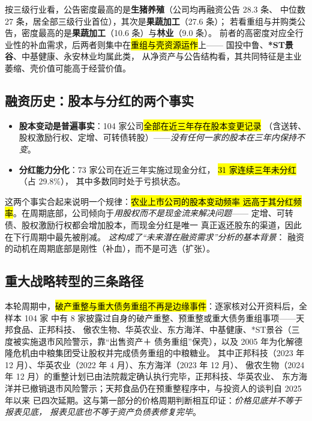 按三级行业看，公告密度最高的是\textbf{生猪养殖}（公司均再融资公告 \num{28.3} 条、
中位数 \num{27} 条，居全部三级行业首位），其次是\textbf{果蔬加工}（\num{27.6} 条）；
若看重组与并购类公告，密度最高的是\textbf{果蔬加工}（\num{10.6} 条）与\textbf{林业}（\num{9.0} 条）。
前者的高密度对应全行业性的补血需求，后两者则集中在\hl{重组与壳资源运作}上——
国投中鲁、\textbf{*ST景谷}、中基健康、永安林业均属此类，
从净资产与公告结构看，其共同特征是主业萎缩、壳价值可能高于经营价值。

\subsection{融资历史：股本与分红的两个事实}
\label{sec:financing-history}

\begin{itemize}[leftmargin=1.4em, itemsep=2pt]
  \item \textbf{股本变动是普遍事实}：\num{104} 家公司\hl{全部在近三年存在股本变更记录}
        （含送转、股权激励行权、定增、可转债转股）——\emph{没有任何一家的股本在三年内保持不变}。
  \item \textbf{分红能力分化}：\num{73} 家公司在近三年实施过现金分红，
        \hl{\num{31} 家连续三年未分红}（占 \num{29.8}\%），
        其中多数同时处于亏损状态。
\end{itemize}

这两个事实合起来说明一个规律：\hl{农业上市公司的股本变动频率
远高于其分红频率}。在周期底部，公司倾向于\emph{用股权而不是现金流来解决问题}——
定增、可转债、股权激励行权都会增加股本，而现金分红是唯一
真正返还股东的渠道，因此在下行周期中最先被削减。
\emph{这构成了“未来潜在融资需求”分析的基本背景}：
融资的动机在周期底部是刚性（补血），而不是可选（扩张）。

\subsection{重大战略转型的三条路径}
\label{sec:financing-strategy}

本轮周期中，\hl{破产重整与重大债务重组不再是边缘事件}：逐家核对公开资料后，全样本 \num{104} 家
中有 \num{8} 家披露过自身的破产重整、预重整或重大债务重组事项——天邦食品、正邦科技、
傲农生物、华英农业、东方海洋、中基健康、*ST景谷（三度被实施退市风险警示，靠“出售资产＋
债务重组”保壳），以及 2005 年为化解德隆危机由中粮集团受让股权并完成债务重组的中粮糖业。
其中正邦科技（2023 年 12 月）、华英农业（2022 年 4 月）、东方海洋（2023 年 12 月）、
傲农生物（2024 年 12 月）的重整计划已由法院裁定确认执行完毕，正邦科技、华英农业、
东方海洋并已撤销退市风险警示；天邦食品仍在预重整程序中，与投资人的谈判自 2025 年以来
已四次延期。这与第一部分的价格周期判断相互印证：\emph{价格见底并不等于报表见底，
报表见底也不等于资产负债表修复完毕}。

